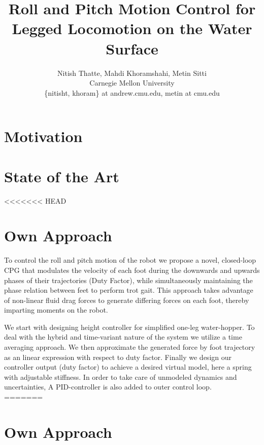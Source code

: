 \documentclass[letterpaper,twocolumn]{article}
\title{Roll and Pitch Motion Control for Legged Locomotion on the Water Surface}
\author{\small Nitish Thatte, Mahdi Khoramshahi, Metin Sitti \\
        \small Carnegie Mellon University \\
        \small \{nitisht, khoram\} at andrew.cmu.edu, metin at cmu.edu
}
\date{}
\begin{document}
\maketitle

\section*{Motivation}


\section*{State of the Art}


<<<<<<< HEAD
\section*{Own Approach}
To control the roll and pitch motion of the robot we propose a novel, closed-loop CPG that modulates the velocity of each foot during the downwards and upwards phases of their trajectories (Duty Factor), while simultaneously maintaining the phase relation between feet to perform trot gait. This approach takes advantage of non-linear fluid drag forces to generate differing forces on each foot, thereby imparting moments on the robot. 
	
We start with designing height controller for simplified one-leg water-hopper. To deal with the hybrid and time-variant nature of the system we utilize a time averaging approach. We then approximate the generated force by foot trajectory as an linear expression with respect to duty factor. Finally we design our controller output (duty factor) to achieve a desired virtual model, here a spring with adjustable stiffness. In order to take care of unmodeled dynamics and uncertainties, A PID-controller is also added to outer control loop.\\
=======
\section{Own Approach}

\end{document}
